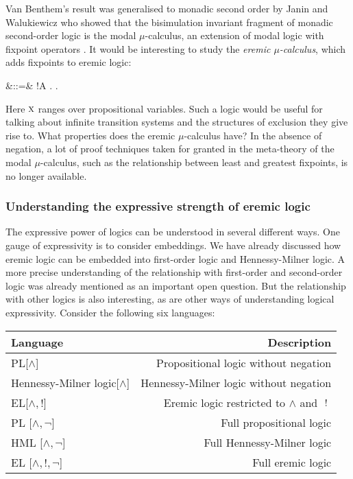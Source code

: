  Van Benthem's result was generalised to monadic second
order by Janin and Walukiewicz \cite{JaninD:expcomotpmcwrtmsol} who
showed that the bisimulation invariant fragment of monadic
second-order logic is the modal $\mu$-calculus, an extension of modal
logic with fixpoint operators \cite{KozenD:respromc}.  It would be
interesting to study the \emph{eremic $\mu$-calculus}, which adds
fixpoints to eremic logic:
\begin{GRAMMAR}
  \phi
     &::=&
  \TRUE
     \VERTICAL
  \phi \AND \psi
     \VERTICAL
  \phi
     \VERTICAL
  !A
     \VERTICAL
  \mu {}.\phi
     \VERTICAL
  \nu {}.\phi
     \VERTICAL
\end{GRAMMAR}

\NI Here $\text{\textsc{x}}$ ranges over propositional variables.  Such a logic
would be useful for talking about infinite transition systems and the
structures of exclusion they give rise to.  What properties does the
eremic $\mu$-calculus have? In the absence of negation, a lot of proof
techniques taken for granted in the meta-theory of the modal
$\mu$-calculus, such as the relationship between least and greatest
fixpoints, is no longer available.

\subsubsection{Understanding the expressive strength of eremic logic}

The expressive power of logics can be understood in several different
ways. One gauge of expressivity is to consider embeddings.  We have
already discussed how eremic logic can be embedded into first-order
logic and Hennessy-Milner logic.  A more precise understanding of the
relationship with first-order and second-order logic was already
mentioned as an important open question. But the relationship with
other logics is also interesting, as are other ways of understanding
logical expressivity.  Consider the following six languages:



\begin{center}
\begin{tabular}{ l | r }
Language & Description \\
\hline
PL[$\land$] & Propositional logic without negation \\
Hennessy-Milner logic[$\land$] & Hennessy-Milner logic without negation \\
EL[$\land, !$] & Eremic logic restricted to $\land$ and $\ ! \ $ \\
PL [$\land, \neg$] & Full propositional logic \\
HML [$\land, \neg$] & Full Hennessy-Milner logic \\
EL [$\land, !, \neg$] & Full eremic logic \\
\end{tabular}
\end{center}


